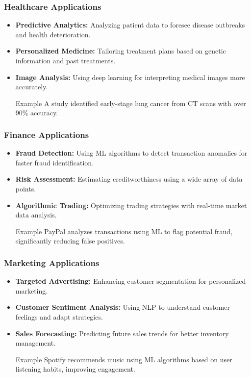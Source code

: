 \documentclass[aspectratio=169]{beamer}
\begin{document}
\begin{frame}[fragile]
    \frametitle{Healthcare Applications}
    \begin{itemize}
        \item \textbf{Predictive Analytics:} Analyzing patient data to foresee disease outbreaks and health deterioration.
        \item \textbf{Personalized Medicine:} Tailoring treatment plans based on genetic information and past treatments.
        \item \textbf{Image Analysis:} Using deep learning for interpreting medical images more accurately.
        \begin{block}{Example}
            A study identified early-stage lung cancer from CT scans with over 90\% accuracy.
        \end{block}
    \end{itemize}
\end{frame}

\begin{frame}[fragile]
    \frametitle{Finance Applications}
    \begin{itemize}
        \item \textbf{Fraud Detection:} Using ML algorithms to detect transaction anomalies for faster fraud identification.
        \item \textbf{Risk Assessment:} Estimating creditworthiness using a wide array of data points.
        \item \textbf{Algorithmic Trading:} Optimizing trading strategies with real-time market data analysis.
        \begin{block}{Example}
            PayPal analyzes transactions using ML to flag potential fraud, significantly reducing false positives.
        \end{block}
    \end{itemize}
\end{frame}

\begin{frame}[fragile]
    \frametitle{Marketing Applications}
    \begin{itemize}
        \item \textbf{Targeted Advertising:} Enhancing customer segmentation for personalized marketing.
        \item \textbf{Customer Sentiment Analysis:} Using NLP to understand customer feelings and adapt strategies.
        \item \textbf{Sales Forecasting:} Predicting future sales trends for better inventory management.
        \begin{block}{Example}
            Spotify recommends music using ML algorithms based on user listening habits, improving engagement.
        \end{block}
    \end{itemize}
\end{frame}
\end{document}
